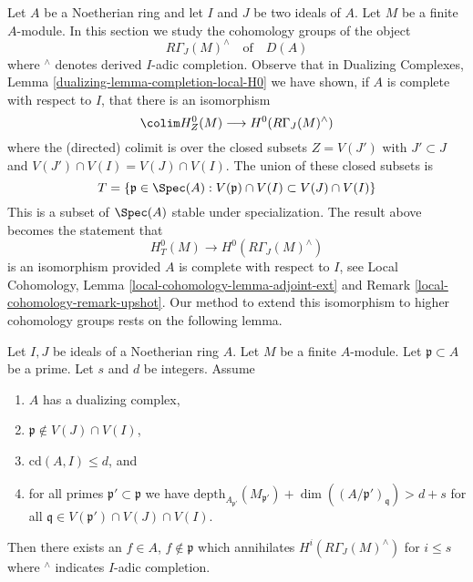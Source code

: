 \noindent
Let $A$ be a Noetherian ring and let $I$ and $J$ be two ideals of $A$.
Let $M$ be a finite $A$-module. In this section we study the
cohomology groups of the object
$$
R\Gamma_J(M)^\wedge
\quad\text{of}\quad
D(A)
$$
where ${}^\wedge$ denotes derived $I$-adic completion. Observe that in
Dualizing Complexes, Lemma \ref{dualizing-lemma-completion-local-H0}
we have shown, if $A$ is complete with respect to $I$,
that there is an isomorphism
$$
\colim H^0_Z(M) \longrightarrow H^0(R\Gamma_J(M)^\wedge)
$$
where the (directed) colimit is over the closed subsets $Z = V(J')$
with $J' \subset J$ and $V(J') \cap V(I) = V(J) \cap V(I)$.
The union of these closed subsets is
\begin{equation}
\label{equation-associated-subset}
T = \{\mathfrak p \in \Spec(A) :
V(\mathfrak p) \cap V(I) \subset V(J) \cap V(I)\}
\end{equation}
This is a subset of $\Spec(A)$ stable under specialization.
The result above becomes the statement that
$$
H^0_T(M) \longrightarrow H^0(R\Gamma_J(M)^\wedge)
$$
is an isomorphism provided $A$ is complete with respect to $I$, see
Local Cohomology, Lemma \ref{local-cohomology-lemma-adjoint-ext} and
Remark \ref{local-cohomology-remark-upshot}.
Our method to extend this isomorphism to higher cohomology groups
rests on the following lemma.

\begin{lemma}
\label{lemma-kill-completion-general}
Let $I, J$ be ideals of a Noetherian ring $A$.
Let $M$ be a finite $A$-module. Let $\mathfrak p \subset A$ be a prime.
Let $s$ and $d$ be integers. Assume
\begin{enumerate}
\item $A$ has a dualizing complex,
\item $\mathfrak p \not \in V(J) \cap V(I)$,
\item $\text{cd}(A, I) \leq d$, and
\item for all primes $\mathfrak p' \subset \mathfrak p$
we have
$\text{depth}_{A_{\mathfrak p'}}(M_{\mathfrak p'}) +
\dim((A/\mathfrak p')_\mathfrak q) > d + s$
for all $\mathfrak q \in V(\mathfrak p') \cap V(J) \cap V(I)$.
\end{enumerate}
Then there exists an $f \in A$, $f \not \in \mathfrak p$ which annihilates
$H^i(R\Gamma_J(M)^\wedge)$ for $i \leq s$ where ${}^\wedge$
indicates $I$-adic completion.
\end{lemma}

